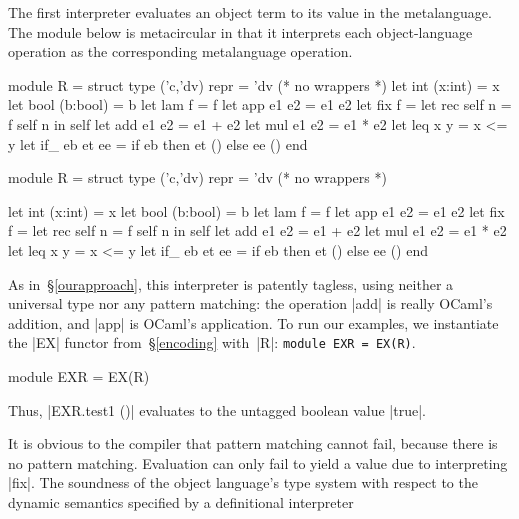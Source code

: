 The first interpreter evaluates an object term to its value in the
metalanguage.  The module below is metacircular in that it
interprets each object\hyp language
operation as the corresponding metalanguage operation.
\ifshort
\begin{code3}
module R = struct type ('c,'dv) repr = 'dv (* no wrappers *)
  let int  (x:int)  = x         let bool (b:bool) = b
  let lam  f        = f         let app  e1 e2    = e1 e2
  let fix  f        = let rec self n = f self n in self
  let add  e1 e2    = e1 + e2   let mul  e1 e2    = e1 * e2
  let leq  x y      = x <= y
  let if_  eb et ee = if eb then et () else ee () end
\end{code3}
\else
\begin{code}
module R = struct
  type ('c,'dv) repr = 'dv (* no wrappers *)

  let int  (x:int)  = x
  let bool (b:bool) = b
  let lam  f        = f
  let app  e1 e2    = e1 e2
  let fix  f        = let rec self n = f self n in self
  let add  e1 e2    = e1 + e2
  let mul  e1 e2    = e1 * e2
  let leq  x y      = x <= y
  let if_  eb et ee = if eb then et () else ee ()
end
\end{code}
\fi
%
As in~\S\ref{ourapproach},
this interpreter is patently tagless, using neither a universal type nor
any pattern matching: the operation |add| is really
OCaml's addition, and |app| is OCaml's application. To run our
examples, we instantiate the |EX| functor from~\S\ref{encoding}
with~|R|\ifshort: \texttt{module EXR = EX(R)}\fi.
\ifshort\else
\begin{code}
module EXR = EX(R)
\end{code}
\fi
Thus, |EXR.test1 ()| evaluates to the untagged boolean value |true|.
\begin{comment}
In Haskell, we define
\begin{code}
newtype R a = R {unR::a}
instance Symantics R where ...
\end{code}
Although |R| looks like a tag, it is only
a |newtype|.  The types |a| and |R a| are represented differently
only at compile time, not at run time.  Pattern matching against~|R|
cannot ever fail and is assuredly compiled away.
\end{comment}
It is obvious to the compiler that
pattern matching cannot fail, because there is no
pattern matching. Evaluation can only fail to yield a value
due to interpreting |fix|.
The soundness of the object language's type system with respect to
the dynamic semantics specified by a definitional interpreter

